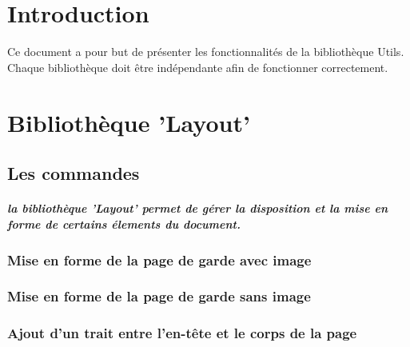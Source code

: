 

\usepackage{lipsum}  





\tableofcontents

\chapter*{Introduction}

Ce document a pour but de présenter les fonctionnalités de la bibliothèque Utils. \n
Chaque bibliothèque doit être indépendante afin de fonctionner correctement.

\chapter{Bibliothèque 'Layout'}

\section{Les commandes}

\paragraph{la bibliothèque 'Layout' permet de gérer la disposition et la mise en forme de certains élements du document. \\}

\subsection{Mise en forme de la page de garde avec image}


\subsection{Mise en forme de la page de garde sans image}


\subsection{Ajout d'un trait entre l'en-tête et le corps de la page}

